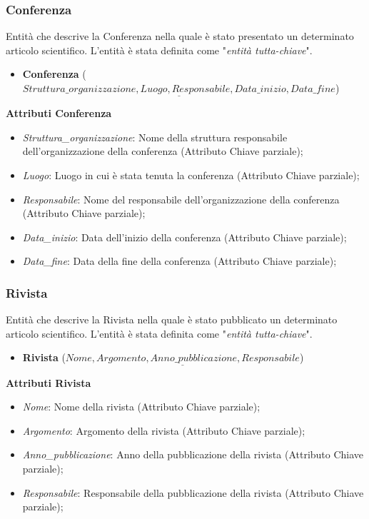 \documentclass[a4paper, 15pt, oneside]{article}
\begin{document}
	\subsubsection{Conferenza}
	Entità che descrive la Conferenza nella quale è stato presentato un determinato articolo scientifico. L'entità è stata definita come "\textit{entità tutta-chiave}".
	\begin{itemize}
		\item \textbf{Conferenza} ($\underline{Struttura\_organizzazione, Luogo, Responsabile, Data\_inizio, Data\_fine}$)
	\end{itemize}
	\textbf{Attributi Conferenza}
	\begin{itemize}
		\item \textit{Struttura\_organizzazione}: Nome della struttura responsabile dell'organizzazione della conferenza (Attributo Chiave parziale);
		\item \textit{Luogo}: Luogo in cui è stata tenuta la conferenza (Attributo Chiave parziale);
		\item \textit{Responsabile}: Nome del responsabile dell'organizzazione della conferenza (Attributo Chiave parziale);
		\item \textit{Data\_inizio}: Data dell'inizio della conferenza (Attributo Chiave parziale);
		\item \textit{Data\_fine}: Data della fine della conferenza (Attributo Chiave parziale);
	\end{itemize}
	\subsubsection{Rivista}
	Entità che descrive la Rivista nella quale è stato pubblicato un determinato articolo scientifico. L'entità è stata definita come "\textit{entità tutta-chiave}".
	\begin{itemize}
		\item \textbf{Rivista} ($\underline{Nome, Argomento, Anno\_pubblicazione, Responsabile}$)
	\end{itemize}
	\textbf{Attributi Rivista}
	\begin{itemize}
		\item \textit{Nome}: Nome della rivista (Attributo Chiave parziale);
		\item \textit{Argomento}: Argomento della rivista (Attributo Chiave parziale);
		\item \textit{Anno\_pubblicazione}: Anno della pubblicazione della rivista (Attributo Chiave parziale);
		\item \textit{Responsabile}: Responsabile della pubblicazione della rivista (Attributo Chiave parziale);
	\end{itemize}
\end{document}

